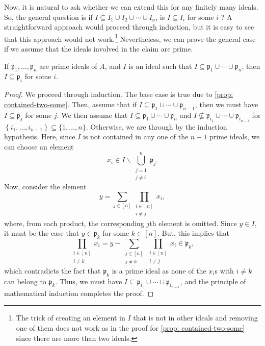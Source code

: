 Now, it is natural to ask whether we can extend this for any finitely many ideals.
So, the general question is if $I \subseteq I_{1} \cup I_{2} \cup \cdots \cup I_{n}$, is $I \subseteq I_{i}$ for some $i$ ? A straightforward approach would proceed through induction, but it is easy to see that this approach would not work.\footnote{The trick of creating an element in $I$ that is not in other ideals and removing one of them does not work as in the proof for \cref{prop: contained-two-some} since there are more than two ideals.} Nevertheless, we can prove the general case if we assume that the ideals involved in the claim are prime. 
\begin{proposition}\label{prop: contained-gen-prime}
    If $\mathfrak{p}_{1}, \ldots, \mathfrak{p}_{n}$ are prime ideals of $A$, and $I$ is an ideal such that $I \subseteq \mathfrak{p}_{1} \cup \cdots \cup \mathfrak{p}_{n}$, then $I \subseteq \mathfrak{p}_{i}$ for some $i$.
\end{proposition} 
\begin{proof}
    We proceed through induction. The base case is true due to \cref{prop: contained-two-some}. Then, assume that if $I \subseteq \mathfrak{p}_{1} \cup \cdots \cup \mathfrak{p}_{n-1}$, then we must have $I \subseteq \mathfrak{p}_{j}$ for some $j$. We then assume that $I \subseteq \mathfrak{p}_{1} \cup \cdots \cup \mathfrak{p}_{n}$ and $I \nsubseteq \mathfrak{p}_{i_{1}} \cup \cdots \cup \mathfrak{p}_{i_{n-1}}$ for  $\left\{i_{1}, \ldots, i_{n-1}\right\} \subseteq\{1, \ldots, n\}$. Otherwise, we are through by the induction hypothesis. 
    Here, since $I$ is not contained in any one of the $n-1$ prime ideals, we can choose an element 
    \[x_{i} \in I \backslash \bigcup_{\substack{j=1\\ j \neq i}}^{n} \mathfrak{p}_{j}.\]
    Now, consider the element 
    \[
    y=\sum_{j\in [n]}\prod_{\substack{i \in [n]\\ i \neq j}} x_i,
    \]
    where, from each product, the corresponding $j$th element is omitted. Since $y \in I$, it must be the case that $y \in \mathfrak{p}_k$ for some $k \in [n]$. But, this implies that 
    \[
    \prod_{\substack{i \in [n]\\ i \neq k}} x_i = y - \sum_{\substack{j\in [n]\\j \neq k}}\prod_{\substack{i \in [n]\\ i \neq j}} x_i \in \mathfrak{p}_k,
    \]
    which contradicts the fact that $\mathfrak{p}_{k}$ is a prime ideal as none of the $x_i$s with $i \neq k$ can belong to $\mathfrak{p}_k$. Thus, we must have $I \subseteq \mathfrak{p}_{i_{1}} \cup \cdots \cup \mathfrak{p}_{i_{n-1}}$, and the principle of mathematical induction completes the proof.
\end{proof}

